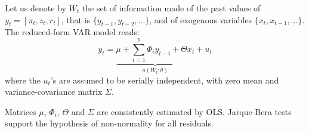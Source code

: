 \documentclass[
  12pt,
]{book}
\newenvironment{Shaded}{\begin{snugshade}}{\end{snugshade}}
\newcommand{\CommentTok}[1]{\textcolor[rgb]{0.56,0.35,0.01}{\textit{#1}}}
\newcommand{\ConstantTok}[1]{\textcolor[rgb]{0.00,0.00,0.00}{#1}}
\newcommand{\ControlFlowTok}[1]{\textcolor[rgb]{0.13,0.29,0.53}{\textbf{#1}}}
\newcommand{\DecValTok}[1]{\textcolor[rgb]{0.00,0.00,0.81}{#1}}
\newcommand{\FunctionTok}[1]{\textcolor[rgb]{0.00,0.00,0.00}{#1}}
\newcommand{\NormalTok}[1]{#1}
\newcommand{\OtherTok}[1]{\textcolor[rgb]{0.56,0.35,0.01}{#1}}
\newcommand{\SpecialCharTok}[1]{\textcolor[rgb]{0.00,0.00,0.00}{#1}}
\theoremstyle{definition}
\theoremstyle{definition}
\theoremstyle{definition}
\theoremstyle{definition}
\theoremstyle{remark}
\begin{document}
Let us denote by \(W_t\) the set of information made of the past values of \(y_t= [\pi_t,z_t,r_t]\), that is \(\{y_{t-1},y_{t-2},\dots\}\), and of exogenous variables \(\{x_{t},x_{t-1},\dots\}\). The reduced-form VAR model reads:
\[
y_t  = \underbrace{\mu + \sum_{i=1}^{p} \Phi_i y_{t-i} + \Theta x_t}_{a(W_t;\theta)} + u_t
\]
where the \(u_t\)'s are assumed to be serially independent, with zero mean and variance-covariance matrix \(\Sigma\).

Matrices \(\mu\), \(\Phi_i\), \(\Theta\) and \(\Sigma\) are consistently estimated by OLS. Jarque-Bera tests support the hypothesis of non-normality for all residuals.

\begin{Shaded}
\end{Shaded}
\end{document}
